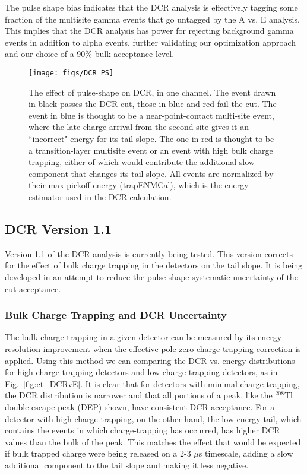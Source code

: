 \documentclass[groupedaddress,rmp,amsmath,amssymb,bibnotes,altaffilletter,twocolumn]{revtex4-1}
\begin{document}
The pulse shape bias indicates that the DCR analysis is effectively tagging some fraction of the multisite gamma events that go untagged by the A vs. E analysis. This implies that the DCR analysis has power for rejecting background gamma events in addition to alpha events, further validating our optimization approach and our choice of a 90\% bulk acceptance level.  

\begin{figure}[h]
 \centering
 \texttt{[image: figs/DCR\_PS]}
 \caption{The effect of pulse-shape on DCR, in one channel. The event drawn in black passes the DCR cut, those in blue and red fail the cut. The event in blue is thought to be a near-point-contact multi-site event, where the late charge arrival from the second site gives it an ``incorrect" energy for its tail slope. The one in red is thought to be a transition-layer multisite event or an event with high bulk charge trapping, either of which would contribute the additional slow component that changes its tail slope. All events are normalized by their max-pickoff energy (trapENMCal), which is the energy estimator used in the DCR calculation.} 
 \label{fig:DCR_PS}
\end{figure}

\subsection{DCR Version 1.1}
Version 1.1 of the DCR analysis is currently being tested. This version corrects for the effect of bulk charge trapping in the detectors on the tail slope. It is being developed in an attempt to reduce the pulse-shape systematic uncertainty of the cut acceptance. 
 
\subsubsection{Bulk Charge Trapping and DCR Uncertainty}
The bulk charge trapping in a given detector can be measured by its energy resolution improvement when the effective pole-zero charge trapping correction is applied. Using this method we can comparing the DCR vs. energy distributions for high charge-trapping detectors and low charge-trapping detectors, as in Fig.~\ref{fig:ct_DCRvE}. It is clear that for detectors with minimal charge trapping, the DCR distribution is narrower and that all portions of a peak, like the $^{208}$Tl double escape peak (DEP) shown, have consistent DCR acceptance. For a detector with high charge-trapping, on the other hand, the low-energy tail, which contains the events in which charge-trapping has occurred, has higher DCR values than the bulk of the peak. This matches the effect that would be expected if bulk trapped charge were being released on a 2-3 $\mu$s timescale, adding a slow additional component to the tail slope and making it less negative. 
\end{document}
